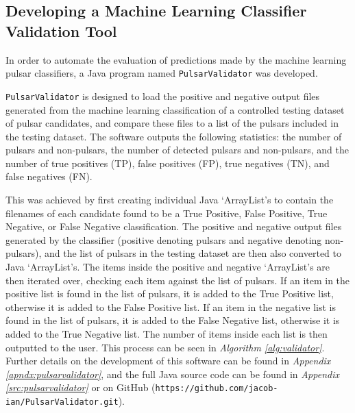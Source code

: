 \documentclass{article}
\begin{document}
\subsection{Developing a Machine Learning Classifier Validation Tool}
\label{sec:methodvalidate}

In order to automate the evaluation of predictions made by the machine learning pulsar classifiers, a Java program named \verb|PulsarValidator| was developed.

\verb|PulsarValidator| is designed to load the positive and negative output files generated from the machine learning classification of a controlled testing dataset of pulsar candidates, and compare these files to a list of the pulsars included in the testing dataset. The software outputs the following statistics: the number of pulsars and non-pulsars, the number of detected pulsars and non-pulsars, and the number of true positives (TP), false positives (FP), true negatives (TN), and false negatives (FN). 

This was achieved by first creating individual Java `ArrayList's to contain the filenames of each candidate found to be a True Positive, False Positive, True Negative, or False Negative classification. The positive and negative output files generated by the classifier (positive denoting pulsars and negative denoting non-pulsars), and the list of pulsars in the testing dataset are then also converted to Java `ArrayList's. The items inside the positive and negative `ArrayList's are then iterated over, checking each item against the list of pulsars. If an item in the positive list is found in the list of pulsars, it is added to the True Positive list, otherwise it is added to the False Positive list. If an item in the negative list is found in the list of pulsars, it is added to the False Negative list, otherwise it is added to the True Negative list. The number of items inside each list is then outputted to the user. This process can be seen in \emph{Algorithm \ref{alg:validator}}. Further details on the development of this software can be found in \emph{Appendix \ref{apndx:pulsarvalidator}}, and the full Java source code can be found in \emph{Appendix \ref{src:pulsarvalidator}} or on GitHub (\verb|https://github.com/jacob-ian/PulsarValidator.git|).
\end{document}
